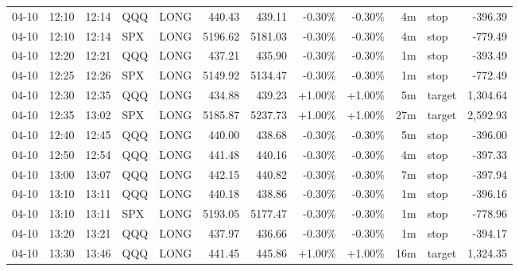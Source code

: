 \documentclass[11pt,a4paper,twoside]{article}
\begin{document}
\begin{center}
\begin{longtable}{>{\color{txtmain}}l l l l l r r r r r >{\color{txtmain}}l r}
04-10 & 12:10 & 12:14 & QQQ & LONG & 440.43 & 439.11 & \textcolor{lossred}{-0.30\%} & \textcolor{lossred}{-0.30\%} & 4m & stop & \textcolor{lossred}{-396.39} \\
04-10 & 12:10 & 12:14 & SPX & LONG & 5196.62 & 5181.03 & \textcolor{lossred}{-0.30\%} & \textcolor{lossred}{-0.30\%} & 4m & stop & \textcolor{lossred}{-779.49} \\
04-10 & 12:20 & 12:21 & QQQ & LONG & 437.21 & 435.90 & \textcolor{lossred}{-0.30\%} & \textcolor{lossred}{-0.30\%} & 1m & stop & \textcolor{lossred}{-393.49} \\
04-10 & 12:25 & 12:26 & SPX & LONG & 5149.92 & 5134.47 & \textcolor{lossred}{-0.30\%} & \textcolor{lossred}{-0.30\%} & 1m & stop & \textcolor{lossred}{-772.49} \\
04-10 & 12:30 & 12:35 & QQQ & LONG & 434.88 & 439.23 & \textcolor{wingreen}{+1.00\%} & \textcolor{wingreen}{+1.00\%} & 5m & target & \textcolor{wingreen}{1,304.64} \\
04-10 & 12:35 & 13:02 & SPX & LONG & 5185.87 & 5237.73 & \textcolor{wingreen}{+1.00\%} & \textcolor{wingreen}{+1.00\%} & 27m & target & \textcolor{wingreen}{2,592.93} \\
04-10 & 12:40 & 12:45 & QQQ & LONG & 440.00 & 438.68 & \textcolor{lossred}{-0.30\%} & \textcolor{lossred}{-0.30\%} & 5m & stop & \textcolor{lossred}{-396.00} \\
04-10 & 12:50 & 12:54 & QQQ & LONG & 441.48 & 440.16 & \textcolor{lossred}{-0.30\%} & \textcolor{lossred}{-0.30\%} & 4m & stop & \textcolor{lossred}{-397.33} \\
04-10 & 13:00 & 13:07 & QQQ & LONG & 442.15 & 440.82 & \textcolor{lossred}{-0.30\%} & \textcolor{lossred}{-0.30\%} & 7m & stop & \textcolor{lossred}{-397.94} \\
04-10 & 13:10 & 13:11 & QQQ & LONG & 440.18 & 438.86 & \textcolor{lossred}{-0.30\%} & \textcolor{lossred}{-0.30\%} & 1m & stop & \textcolor{lossred}{-396.16} \\
04-10 & 13:10 & 13:11 & SPX & LONG & 5193.05 & 5177.47 & \textcolor{lossred}{-0.30\%} & \textcolor{lossred}{-0.30\%} & 1m & stop & \textcolor{lossred}{-778.96} \\
04-10 & 13:20 & 13:21 & QQQ & LONG & 437.97 & 436.66 & \textcolor{lossred}{-0.30\%} & \textcolor{lossred}{-0.30\%} & 1m & stop & \textcolor{lossred}{-394.17} \\
04-10 & 13:30 & 13:46 & QQQ & LONG & 441.45 & 445.86 & \textcolor{wingreen}{+1.00\%} & \textcolor{wingreen}{+1.00\%} & 16m & target & \textcolor{wingreen}{1,324.35} \\

\end{longtable}
\end{center}
\end{document}
